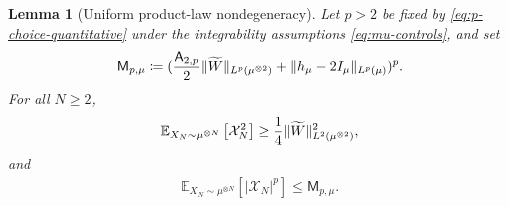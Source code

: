 \documentclass[11pt,reqno]{amsart}
\numberwithin{equation}{section}
\theoremstyle{plain}
\newtheorem{lemma}[lemma]{Lemma}
\theoremstyle{remark}
\DeclarePairedDelimiter{\pa}{\lparen}{\rparen}
\DeclarePairedDelimiter{\norm}{\lVert}{\rVert}
\newcommand{\E}{{\mathbb{E}}}
\newcommand{\tl}{\widetilde}
\begin{document}
\begin{lemma}[Uniform product-law nondegeneracy]\label{lem:product-nondegenerate}
Let \(p>2\) be fixed by \eqref{eq:p-choice-quantitative} under the integrability assumptions \eqref{eq:mu-controls}, and set
\begin{align}\label{eq:Mp-mu-def}
 \mathsf M_{p,\mu}
 \coloneqq
 \pa{\frac{\mathsf A_{2,p}}2\norm{\tl W}_{L^p(\mu^{\otimes2})}
 +\norm{h_\mu-2I_\mu}_{L^p(\mu)}}^p .
\end{align}
For all \(N\ge2\),
\begin{align}\label{eq:calX-var-lower}
 \E_{X_N\sim\mu^{\otimes N}}\left[\mathcal X_N^2\right]
 \ge \frac14\norm{\tl W}_{L^2(\mu^{\otimes2})}^2,
\end{align}
and
\begin{align}\label{eq:calX-Lp-upper}
 \E_{X_N\sim\mu^{\otimes N}}\left[|\mathcal X_N|^p\right]\le \mathsf M_{p,\mu}.
\end{align}
\end{lemma}
\end{document}
